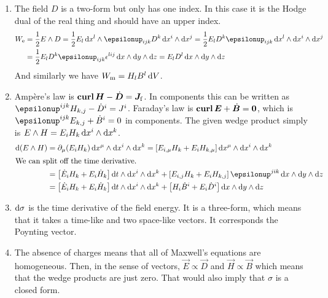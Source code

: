 \documentclass[11pt, english, fleqn, DIV=15, headinclude, BCOR=1cm]{scrartcl}
\begin{document}
\begin{enumerate}
    \item
The field $D$ is a two-form but only has one index. In this case it is the
Hodge dual of the real thing and should have an upper index.
\begin{align*}
    W_\mathrm e
    &= \frac12 E \wedge D
    = \frac 12 E_l \dif x^l \wedge \epsilonup_{ijk} D^k \dif x^i \wedge \dif
    x^j
    = \frac 12 E_l D^k \epsilonup_{ijk} \dif x^l \wedge \dif x^i \wedge \dif
    x^j \\
    &= \frac 12 E_l D^k \epsilonup_{ijk} \epsilon^{lij} \dif x \wedge \dif y \wedge \dif
    z
    = E_l D^l \dif x \wedge \dif y \wedge \dif z
\end{align*}
And similarly we have $W_\mathrm m = H_l B^l \mathop{}\!\mathrm d V$.

\item

Ampère's law is $\curl \vec H - \dot {\vec D} = \vec J_\mathrm f$. In
components this can be written as $\epsilonup^{ijk} H_{k,j} - \dot D^i = J^i$.
Faraday's law is $\curl \vec E + \dot{\vec B} = \vec 0$, which is
$\epsilonup^{ijk} E_{k,j} + \dot B^i = 0$ in components. The given wedge
product simply is $E \wedge H = E_i H_k \mathop{}\!\mathrm d x^i \wedge \mathop{}\!\mathrm d x^k$.
\begin{align*}
    \dif(E \wedge H)
    &= \partial_\mu (E_i H_k) \dif x^\mu \wedge \dif x^i \wedge \dif x^k
    = \sbr{E_{i,\mu} H_k + E_i H_{k,\mu}} \dif x^\mu \wedge \dif x^i \wedge
    \dif x^k \\
    \intertext{%
        We can split off the time derivative.
    }
    &= \sbr{\dot E_i H_k + E_i \dot H_k} \dif t \wedge \dif x^i \wedge \dif x^k
    + \sbr{E_{i,j} H_k + E_i H_{k,j}} \epsilonup^{jik} \dif x \wedge \dif y
    \wedge \dif z \\
    &= \sbr{\dot E_i H_k + E_i \dot H_k} \dif t \wedge \dif x^i \wedge \dif x^k
    + \sbr{H_i \dot B^i + E_i \dot D^i} \dif x \wedge \dif y \wedge \dif z \\
\end{align*}

\item
    $\mathop{}\!\mathrm d \sigma$ is the time derivative of the field energy. It is a
    three-form, which means that it takes a time-like and two space-like
    vectors. It corresponds the Poynting vector.

\item
    The absence of charges means that all of Maxwell's equations are
    homogeneous. Then, in the sense of vectors, $\vec E \propto \vec D$ and
    $\vec H \propto \vec B$ which means that the wedge products are just zero.
    That would also imply that $\sigma$ is a closed form.

\end{enumerate}
\end{document}
